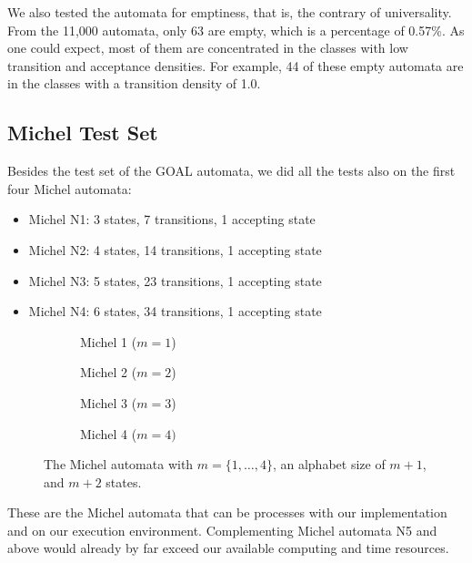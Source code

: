 We also tested the automata for emptiness, that is, the contrary of universality. From the 11,000 automata, only 63 are empty, which is a percentage of 0.57\%. As one could expect, most of them are concentrated in the classes with low transition and acceptance densities. For example, 44 of these empty automata are in the classes with a transition density of 1.0.


\subsection{Michel Test Set}
Besides the test set of the GOAL automata, we did all the tests also on the first four Michel automata:
\begin{itemize}
\item Michel N1: 3 states, 7 transitions, 1 accepting state
\item Michel N2: 4 states, 14 transitions, 1 accepting state
\item Michel N3: 5 states, 23 transitions, 1 accepting state
\item Michel N4: 6 states, 34 transitions, 1 accepting state
\end{itemize}

\newcommand{\subwidth}{0.42}

\begin{figure}[htb]
\centering
  \begin{subfigure}[t]{\subwidth\textwidth}
  \MichelOne
  \caption{Michel 1 ($m=1$)}
  \end{subfigure}
  \begin{subfigure}[t]{\subwidth\textwidth}
  \MichelTwo
  \caption{Michel 2 ($m=2$)}
  \end{subfigure}

  \begin{subfigure}[b]{\subwidth\textwidth}
  \MichelThree
  \caption{Michel 3 ($m=3$)}
  \end{subfigure}
  \begin{subfigure}[b]{\subwidth\textwidth}
  \MichelFour
  \caption{Michel 4 ($m=4)$}
  \end{subfigure}
\caption{The Michel automata with $m = \{1,\dots,4\}$, an alphabet size of $m+1$, and $m+2$ states.}
\end{figure}

\MichelOne
\MichelTwo
\MichelThree
\MichelFour

\Automaton

These are the Michel automata that can be processes with our implementation and on our execution environment. Complementing Michel automata N5 and above would already by far exceed our available computing and time resources.



